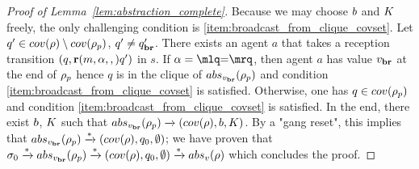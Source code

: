 \begin{proof}[Proof of Lemma~\ref{lem:abstraction_complete}]
Because we may choose $\boss$ and $\clique$ freely, the only challenging condition is \ref{item:broadcast_from_clique_covset}.
Let $q' \in \statesin{\run} \setminus \statesin{\run_p}$, $q' \ne q_{\textbf{br}}'$. 
There exists an agent $a$ that takes a reception transition $(q,\textbf{r}(m, \alpha, ,)q')$ in $s$. 
If $\anact = \quotemarks{\eqtestact}$, then agent $a$ has value $v_{\textbf{br}}$ at the end of $\rho_p$ hence $q$ is in the clique of $\absproj{\avalbr}{\run_p}$ and condition \ref{item:broadcast_from_clique_covset} is satisfied. Otherwise, one has $q \in \statesin{\run_p}$ and condition \ref{item:broadcast_from_clique_covset} is satisfied.
In the end, there exist $\boss$, $\clique$ such that $\absproj{\avalbr}{\run_p} \step{} (\statesin{\run}, \boss,\clique)$. By a "gang reset", this implies that $\absproj{\avalbr}{\run_p} \step{*} (\statesin{\run}, q_0, \emptyset)$; we have proven that $\aconfiginit \step{*}\absproj{\avalbr}{\run_p} \step{*} (\statesin{\run}, q_0, \emptyset) \step{*} \absproj{\aval}{\run}$ which concludes the proof. 
\end{proof}
\fi



